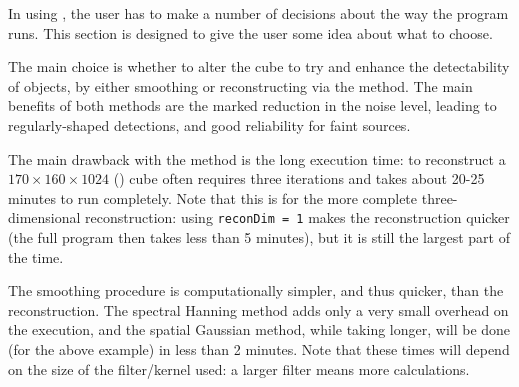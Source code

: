%
%
%
%
\label{sec-notes}

In using \duchamp, the user has to make a number of decisions about
the way the program runs. This section is designed to give the user
some idea about what to choose.

The main choice is whether to alter the cube to try and enhance the
detectability of objects, by either smoothing or reconstructing via
the \atrous method. The main benefits of both methods are the marked
reduction in the noise level, leading to regularly-shaped detections,
and good reliability for faint sources.

The main drawback with the \atrous method is the long execution time:
to reconstruct a $170\times160\times1024$ (\hipass) cube often
requires three iterations and takes about 20-25 minutes to run
completely. Note that this is for the more complete three-dimensional
reconstruction: using \texttt{reconDim = 1} makes the reconstruction
quicker (the full program then takes less than 5 minutes), but it is
still the largest part of the time.

The smoothing procedure is computationally simpler, and thus quicker,
than the reconstruction. The spectral Hanning method adds only a very
small overhead on the execution, and the spatial Gaussian method,
while taking longer, will be done (for the above example) in less than
2 minutes. Note that these times will depend on the size of the
filter/kernel used: a larger filter means more calculations.

